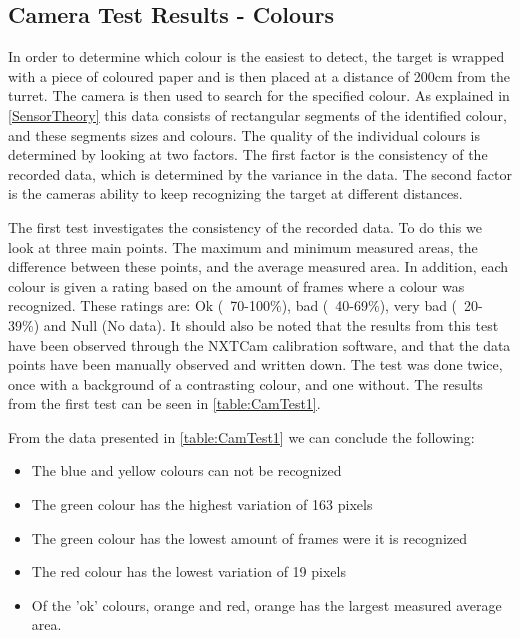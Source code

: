
\subsection{Camera Test Results - Colours}\label{CamTestColours}
In order to determine which colour is the easiest to detect, the target is
wrapped with a piece of coloured paper and is then placed at a distance of
200cm from the turret. The camera is then used to search for the specified
colour. As explained in \autoref{SensorTheory} this data consists of rectangular
segments of the identified colour, and these segments sizes and colours. The
quality of the individual colours is determined by looking at two factors. The first factor is
the consistency of the recorded data, which is determined by the variance in the
data. The second factor is the cameras ability to keep recognizing the target
at different distances.\nl

The first test investigates the consistency of the recorded data. To do this we
look at three main points. The maximum and minimum measured areas, the difference
between these points, and the average measured area. In addition, each colour is
given a rating based on the amount of frames where a colour was recognized.
These ratings are: Ok (~70-100\%), bad (~40-69\%), very bad (~20-39\%) and Null
(No data). It should also be noted that the results from this test have been
observed through the NXTCam calibration software, and that the data points have
been manually observed and written down. The test was done twice, once with a
background of a contrasting colour, and one without. The results from the first
test can be seen in \autoref{table:CamTest1}.


From the data presented in \autoref{table:CamTest1} we can conclude the
following:
\begin{itemize}
  \item The blue and yellow colours can not be recognized
  \item The green colour has the highest variation of 163 pixels
  \item The green colour has the lowest amount of frames were it is recognized
  \item The red colour has the lowest variation of 19 pixels
  \item Of the 'ok' colours, orange and red, orange has the largest measured
  average area.
\end{itemize} 

